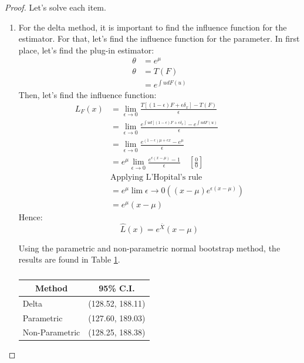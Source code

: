 \documentclass[11pt]{article}
\theoremstyle{definition}
\theoremstyle{remark}
\theoremstyle{remark}
\begin{document}
\begin{proof}
  Let's solve each item.
  \begin{enumerate}[label=\alph*)]
  \item For the delta method, it is important to find the influence
    function for the estimator. For that, let's find the influence
    function for the parameter. In first place, let's find the plug-in
    estimator:
    \begin{align*}
      \theta &= e^\mu \\
      \theta &= T(F) \\
             &= e^{\int u dF(u)}
    \end{align*}
    Then, let's find the influence function:
    \begin{align*}
      L_F(x) &= \lim_{\epsilon \rightarrow 0} \frac{T\left[(1 - \epsilon)F +
               \epsilon \delta_x\right] - T(F)}{\epsilon} \\
      &= \lim_{\epsilon \rightarrow 0} \frac{e^{\int u d\left[(1 - \epsilon)F +
        \epsilon \delta_x\right]} - e^{\int u dF(u)}}{\epsilon} \\
             &= \lim_{\epsilon \rightarrow 0} \frac{e^{(1 - \epsilon)\mu + \epsilon x} - e^\mu}
               {\epsilon} \\
             &= e^\mu \lim_{\epsilon \rightarrow 0} \frac{e^{\epsilon(x - \mu)} - 1}{\epsilon}
             \quad \left[\frac{0}{0}\right]\\
             &\text{Applying L'Hopital's rule} \\
             &= e^\mu \lim{\epsilon \rightarrow 0} \left((x - \mu) e^{\epsilon(x - \mu)}\right) \\
             &= e^\mu (x - \mu)
    \end{align*}
    Hence:
    \begin{equation*}
      \hat{L}(x) = e^{\bar{X}} (x - \mu)
    \end{equation*}

    Using the parametric and non-parametric normal bootstrap method,
    the results are found in Table \ref{tab:cis1}.
    \begin{table}[H]
      \centering
      \begin{tabular}{ll}
        \hline
        \multicolumn{1}{c}{\textbf{Method}} & \multicolumn{1}{c}{\textbf{95\% C.I.}} \\ \hline
        Delta                               & (128.52, 188.11)     \\
        Parametric                          & (127.60, 189.03)     \\
        Non-Parametric                      & (128.25, 188.38)
      \end{tabular}
      \caption{}
      \label{tab:cis1}
    \end{table}


\end{enumerate}
\end{proof}
\end{document}
